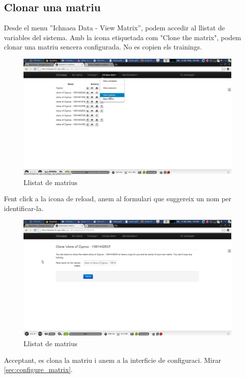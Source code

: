 \begin{itemize}
\section{Clonar una matriu}
\label{sec:clone_matrix}
Desde el menu ''Ichnaea Data - View Matrix'', podem accedir al llistat de variables del sistema. Amb la icona etiquetada com "Clone the matrix", podem clonar una matriu sencera configurada. No es copien els trainings.
\begin{figure}[h!]
  \centering
  \includegraphics[scale=0.2]{img/userguide/clone_matrix.png}
  \caption{Llistat de matrius}
  \label{fig:placement}
\end{figure}
Fent click a la icona de reload, anem al formulari que suggereix un nom per identificar-la.
\begin{figure}[h!]
  \centering
  \includegraphics[scale=0.2]{img/userguide/clone_matrix-2.png}
  \caption{Llistat de matrius}
  \label{fig:placement}
\end{figure}
Acceptant, es clona la matriu i anem a la interficie de configuraci. Mirar \ref{sec:configure_matrix}.


\end{itemize}
